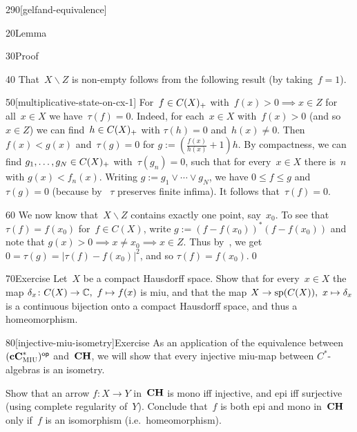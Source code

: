 \begin{parsec}{290}[gelfand-equivalence]
\begin{point}{20}{Lemma}
\begin{point}{30}{Proof}
\begin{point}{40}
That~$X\backslash Z$ is non-empty
follows from the following result (by taking~$f=1$).
\end{point}
\begin{point}{50}[multiplicative-state-on-cx-1]%
For~$f\in C(X)_{+}$
with~$f(x)> 0 \implies x\in Z$ for all~$x\in X$
we have~$\tau(f)=0$.
Indeed, for each~$x\in X$ with~$f(x)>0$
(and so~$x\in Z$)
we can find~$h\in C(X)_{+}$
with $\tau(h)=0$ and~$h(x)\neq 0$.
Then~$f(x)< g(x)$
and~$\tau(g)=0$
for $g:=(\frac{f(x)}{h(x)}+1)h$.
By compactness,
we can find $g_1,\dotsc,g_N\in C(X)_{+}$
with~$\tau(g_n)=0$,
such that for every~$x\in X$
there is~$n$ with $g(x)<f_n(x)$.
Writing $g:=g_1\vee \dotsb \vee g_N$,
we have $0\leq f\leq g$ and~$\tau(g)=0$
(because by~
$\tau$ preserves finite infima).
It follows that~$\tau(f)=0$.
\end{point}
\begin{point}{60}%
We now know that~$X\backslash Z$ contains exactly
one point, say~$x_0$.
To see that~$\tau(f)=f(x_0)$
for~$f\in C(X)$,
write $g:=(f-f(x_0))^*(f-f(x_0))$
and note that $g(x)>0\implies x\neq x_0\implies  x\in Z$.
Thus by~,
we get $0=\tau(g)=\left|\tau(f)-f(x_0)\right|^2$,
and so $\tau(f)=f(x_0)$.\qed
\end{point}
\end{point}
\end{point}
\begin{point}{70}{Exercise}%
Let~$X$ be a compact Hausdorff space.
Show that for every~$x\in X$
the map $\delta_x\colon C(X)\to \mathbb{C},\ f\mapsto f(x)$
is miu,
and that the map $X\to \mathrm{sp}(C(X)),\ x\mapsto \delta_x$
is a continuous bijection
onto a compact Hausdorff space,
and thus a homeomorphism.
\end{point}
\begin{point}{80}[injective-miu-isometry]{Exercise}%
As an application of the equivalence
between ${(\mathbf{cC}^*_{\text{\textsc{MIU}}})}{^{\mathsf{op}}}$
and~$\mathbf{CH}$,
we will show that every injective miu-map
between $C^*$-algebras
is an isometry.

Show that an arrow $f\colon X\to Y$
in~$\mathbf{CH}$ is mono iff injective, and epi iff surjective
(using complete regularity of~$Y$).
Conclude that~$f$ is both epi and mono in~$\mathbf{CH}$
only if~$f$ is an isomorphism (i.e.~homeomorphism).


\end{point}
\end{parsec}
